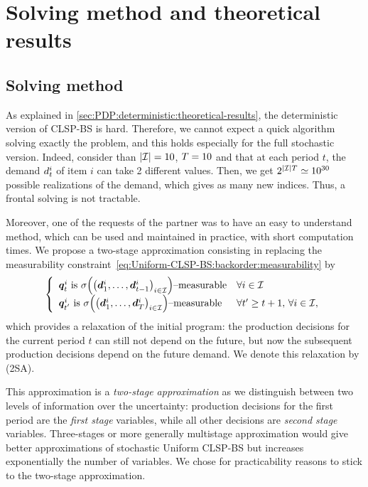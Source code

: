 \section{Solving method and theoretical results}


\subsection{Solving method}
\label{sec:PDP:stochastic:solving-method:solving-method}


As explained in \cref{sec:PDP:deterministic:theoretical-results}, the deterministic version of CLSP-BS is hard.
Therefore, we cannot expect a quick algorithm solving exactly the problem, and this holds especially for the full stochastic version.
Indeed, consider than $\card{\REF}=10$, $T=10$ and that at each period $t$, the demand $d_t^i$ of item $i$ can take 2 different values.
Then, we get $2^{\card{\REF}\horizon}\simeq10^{30}$ possible realizations of the demand, which gives as many new indices.
Thus, a frontal solving is not tractable.


Moreover, one of the requests of the partner was to have an easy to understand method, which can be used and maintained in practice, with short computation times.
We propose a two-stage approximation consisting in replacing the measurability constraint~\eqref{eq:Uniform-CLSP-BS:backorder:measurability} by
\begin{equation}
\left\{
\begin{array}{l@{\quad}l}
\va\quantity_{t}^i\ \mbox{is}\ \Sfield{\bracket{\va\demand_1^i,\ldots,\va\demand_{t-1}^i}_{i\in\REF}}\mbox{--measurable}& \forall i\in\REF
\\
\va\quantity_{t'}^i\ \mbox{is}\ \Sfield{\bracket{\va\demand_1^i,\ldots,\va\demand_{\horizon}^i}_{i\in\REF}}\mbox{--measurable}& \forall t'\geq t+1,\, \forall i\in\REF,
\end{array}
\right.
\end{equation}
which provides a relaxation of the initial program: the production decisions for the current period $t$ can still not depend on the future, but now the subsequent production decisions depend on the future demand.
We denote this relaxation by (2SA).


This approximation is a \emph{two-stage approximation} as we distinguish between two levels of information over the uncertainty: production decisions for the first period are the \emph{first stage} variables, while all other decisions are \emph{second stage} variables.
Three-stages or more generally multistage approximation would give better approximations of stochastic Uniform CLSP-BS but increases exponentially the number of variables.
We chose for practicability reasons to stick to the two-stage approximation.


